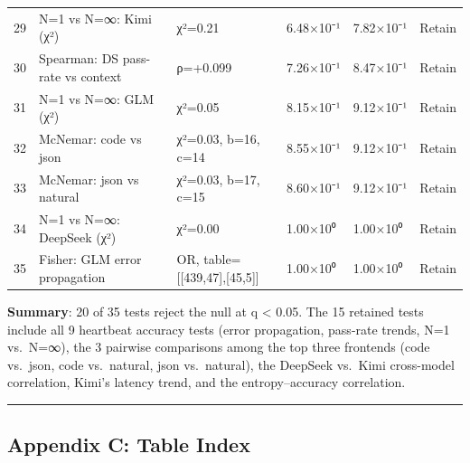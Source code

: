 {\begin{longtable}[]{@{}llllll@{}}
29 & N=1 vs N=∞: Kimi (χ²) & χ²=0.21 & 6.48×10⁻¹ & 7.82×10⁻¹ & Retain \\

30 & Spearman: DS pass-rate vs context & ρ=+0.099 & 7.26×10⁻¹ & 8.47×10⁻¹ & Retain \\

31 & N=1 vs N=∞: GLM (χ²) & χ²=0.05 & 8.15×10⁻¹ & 9.12×10⁻¹ & Retain \\

32 & McNemar: code vs json & χ²=0.03, b=16, c=14 & 8.55×10⁻¹ & 9.12×10⁻¹ & Retain \\

33 & McNemar: json vs natural & χ²=0.03, b=17, c=15 & 8.60×10⁻¹ & 9.12×10⁻¹ & Retain \\

34 & N=1 vs N=∞: DeepSeek (χ²) & χ²=0.00 & 1.00×10⁰ & 1.00×10⁰ & Retain \\

35 & Fisher: GLM error propagation & OR, table={[}{[}439,47{]},{[}45,5{]}{]} & 1.00×10⁰ & 1.00×10⁰ & Retain \\

\end{longtable}

}



\textbf{Summary}: 20 of 35 tests reject the null at q \textless{} 0.05. The 15 retained tests include all 9 heartbeat accuracy tests (error propagation, pass-rate trends, N=1 vs.~N=∞), the 3 pairwise comparisons among the top three frontends (code vs.~json, code vs.~natural, json vs.~natural), the DeepSeek vs.~Kimi cross-model correlation, Kimi's latency trend, and the entropy--accuracy correlation.



\begin{center}\rule{0.5\linewidth}{0.5pt}\end{center}



\subsection{Appendix C: Table Index}\label{appendix-c-table-index}



